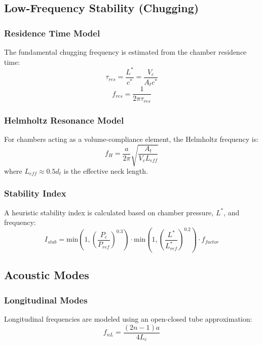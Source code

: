 \subsection{Low-Frequency Stability (Chugging)}

\subsubsection{Residence Time Model}
The fundamental chugging frequency is estimated from the chamber residence time:
\begin{equation}
\tau_{res} = \frac{L^*}{c^*} = \frac{V_c}{A_t c^*}
\end{equation}
\begin{equation}
f_{res} = \frac{1}{2\pi \tau_{res}}
\end{equation}

\subsubsection{Helmholtz Resonance Model}
For chambers acting as a volume-compliance element, the Helmholtz frequency is:
\begin{equation}
f_H = \frac{a}{2\pi} \sqrt{\frac{A_t}{V_c L_{eff}}}
\end{equation}
where $L_{eff} \approx 0.5 d_t$ is the effective neck length.

\subsubsection{Stability Index}
A heuristic stability index is calculated based on chamber pressure, $L^*$, and frequency:
\begin{equation}
I_{stab} = \text{min}\left(1, \left(\frac{P_c}{P_{ref}}\right)^{0.3}\right) \cdot \text{min}\left(1, \left(\frac{L^*}{L^*_{ref}}\right)^{0.2}\right) \cdot f_{factor}
\end{equation}

\subsection{Acoustic Modes}

\subsubsection{Longitudinal Modes}
Longitudinal frequencies are modeled using an open-closed tube approximation:
\begin{equation}
f_{nL} = \frac{(2n-1) a}{4 L_c}
\end{equation}

